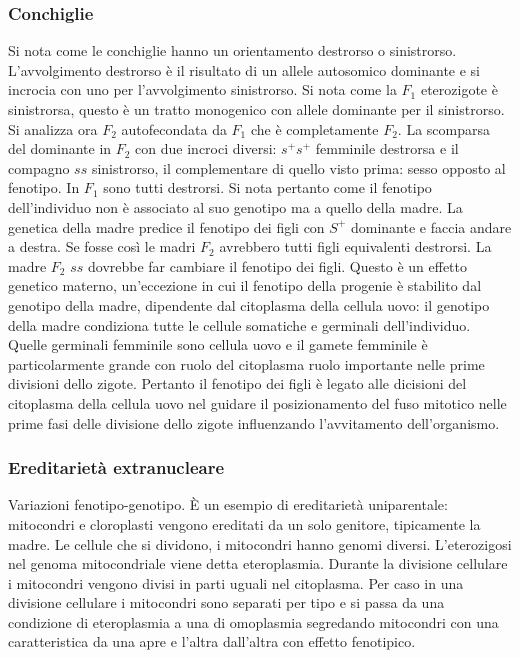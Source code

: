 \subsubsection{Conchiglie}
Si nota come le conchiglie hanno un orientamento destrorso o sinistrorso. L'avvolgimento destrorso \`e il risultato di un allele autosomico dominante e si incrocia con uno per 
l'avvolgimento sinistrorso. Si nota come la $F_1$ eterozigote \`e sinistrorsa, questo \`e un tratto monogenico con allele dominante per il sinistrorso. Si analizza ora $F_2$ 
autofecondata da $F_1$ che \`e completamente $F_2$. La scomparsa del dominante in $F_2$ con due incroci diversi: $s^+s^+$ femminile destrorsa e il compagno $ss$ sinistrorso, il 
complementare di quello visto prima: sesso opposto al fenotipo. In $F_1$ sono tutti destrorsi. Si nota pertanto come il fenotipo dell'individuo non \`e associato al suo genotipo ma a
quello della madre. La genetica della madre predice il fenotipo dei figli con $S^+$ dominante e faccia andare a destra. Se fosse cos\`i le madri $F_2$ avrebbero tutti figli equivalenti
destrorsi. La madre $F_2$ $ss$ dovrebbe far cambiare il fenotipo dei figli. Questo \`e un effetto genetico materno, un'eccezione in cui il fenotipo della progenie \`e stabilito dal
genotipo della madre, dipendente dal citoplasma della cellula uovo: il genotipo della madre condiziona tutte le cellule somatiche e germinali dell'individuo. Quelle germinali femminile
sono cellula uovo e il gamete femminile \`e particolarmente grande con ruolo del citoplasma ruolo importante nelle prime divisioni dello zigote. Pertanto il fenotipo dei figli 
\`e legato alle dicisioni del citoplasma della cellula uovo nel guidare il posizionamento del fuso mitotico nelle prime fasi delle divisione dello zigote influenzando l'avvitamento 
dell'organismo. 
\subsubsection{Ereditariet\`a extranucleare}
Variazioni fenotipo-genotipo. \`E un esempio di ereditariet\`a uniparentale: mitocondri e cloroplasti vengono ereditati da un solo genitore, tipicamente la madre. Le cellule che si 
dividono, i mitocondri hanno genomi diversi. L'eterozigosi nel genoma mitocondriale viene detta eteroplasmia. Durante la divisione cellulare i mitocondri vengono divisi in parti 
uguali nel citoplasma. Per caso in una divisione cellulare i mitocondri sono separati per tipo e si passa da una condizione di eteroplasmia a una di omoplasmia segredando mitocondri 
con una caratteristica da una apre e l'altra dall'altra con effetto fenotipico. 
